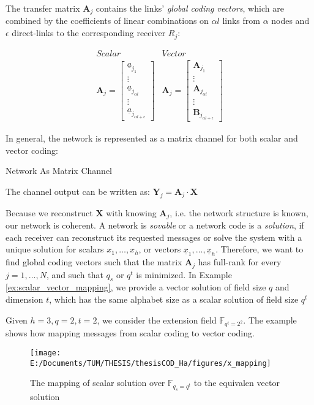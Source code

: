 The transfer matrix $\boldsymbol{A}_{j}$ contains the links' \textit{global
coding vectors}, which are combined by the coefficients of linear
combinations on $\alpha l$ links from $\alpha$ nodes and $\epsilon$
direct-links to the corresponding receiver $R_{j}$:

\[
\begin{array}{c|c}
Scalar & Vector\\
\boldsymbol{A}_{j}=\left[\begin{array}{c}
\underline{a}_{j_{1}}\\
\vdots\\
\underline{a}_{j_{\alpha l}}\\
\vdots\\
\underline{a}_{j_{\alpha l+\epsilon}}
\end{array}\right] & \boldsymbol{A}_{j}=\left[\begin{array}{c}
\boldsymbol{A}_{j_{1}}\\
\vdots\\
\boldsymbol{A}_{j_{\alpha l}}\\
\vdots\\
\boldsymbol{B}_{j_{\alpha l+\epsilon}}
\end{array}\right]
\end{array}
\]

In general, the network is represented as a matrix channel for both
scalar and vector coding:
\begin{defn}
Network As Matrix Channel

The channel output can be written as: $\boldsymbol{Y}_{j}=\boldsymbol{A}_{j}\cdot\boldsymbol{X}$
\end{defn}
Because we reconstruct $\boldsymbol{X}$ with knowing $\boldsymbol{A}_{j}$,
i.e. the network structure is known, our network is coherent. A network
is \textit{sovable} or a network code is a \textit{solution}, if each
receiver can reconstruct its requested messages or solve the system
with a unique solution for scalars $x_{1},\ldots,x_{h}$, or vectors
$\underline{x}_{1},\ldots,\underline{x}_{h}$. Therefore, we want
to find global coding vectors such that the matrix $\boldsymbol{A}_{j}$
has full-rank for every $j=1,\ldots,N$, and such that $q_{s}$ or
$q^{t}$ is minimized. In Example \ref{ex:scalar_vector_mapping},
we provide a vector solution of field size $q$ and dimension $t$,
which has the same alphabet size as a scalar solution of field size
$q^{t}$
\begin{example}
\label{ex:scalar_vector_mapping} 

Given $h=3,q=2,t=2$, we consider the extension field $\ensuremath{\mathbb{F}}_{q^{t}=2^{2}}$.
The example shows how mapping messages from scalar coding to vector
coding.
\end{example}
\begin{figure}[H]
\caption{The mapping of scalar solution over $\ensuremath{\mathbb{F}}_{q_{s}=q^{t}}$
to the equivalen vector solution\label{fig:x_mapping}}

\texttt{[image: E:/Documents/TUM/THESIS/thesisCOD\_Ha/figures/x\_mapping]}
\end{figure}

